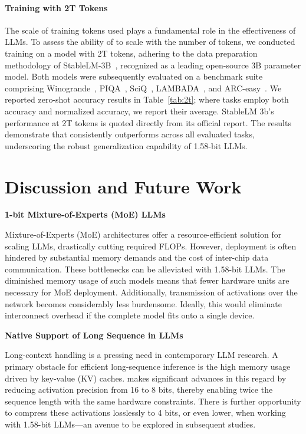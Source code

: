 \paragraph{Training with 2T Tokens}

The scale of training tokens used plays a fundamental role in the effectiveness of LLMs. To assess the ability of  to scale with the number of tokens, we conducted training on a  model with 2T tokens, adhering to the data preparation methodology of StableLM-3B~\cite{StableLM-3B-4E1T}, recognized as a leading open-source 3B parameter model. Both models were subsequently evaluated on a benchmark suite comprising Winogrande~\cite{winoGrande}, PIQA~\cite{piqa}, SciQ~\cite{sciq}, LAMBADA~\cite{lambada}, and ARC-easy~\cite{arc}. We reported zero-shot accuracy results in Table~\ref{tab:2t}; where tasks employ both accuracy and normalized accuracy, we report their average. StableLM 3b’s performance at 2T tokens is quoted directly from its official report. The results demonstrate that  consistently outperforms across all evaluated tasks, underscoring the robust generalization capability of 1.58-bit LLMs.

\section{Discussion and Future Work}

\textbf{1-bit Mixture-of-Experts (MoE) LLMs}

Mixture-of-Experts (MoE) architectures offer a resource-efficient solution for scaling LLMs, drastically cutting required FLOPs. However, deployment is often hindered by substantial memory demands and the cost of inter-chip data communication. These bottlenecks can be alleviated with 1.58-bit LLMs. The diminished memory usage of such models means that fewer hardware units are necessary for MoE deployment. Additionally, transmission of activations over the network becomes considerably less burdensome. Ideally, this would eliminate interconnect overhead if the complete model fits onto a single device.

\textbf{Native Support of Long Sequence in LLMs}

Long-context handling is a pressing need in contemporary LLM research. A primary obstacle for efficient long-sequence inference is the high memory usage driven by key-value (KV) caches.  makes significant advances in this regard by reducing activation precision from 16 to 8 bits, thereby enabling twice the sequence length with the same hardware constraints. There is further opportunity to compress these activations losslessly to 4 bits, or even lower, when working with 1.58-bit LLMs—an avenue to be explored in subsequent studies.

